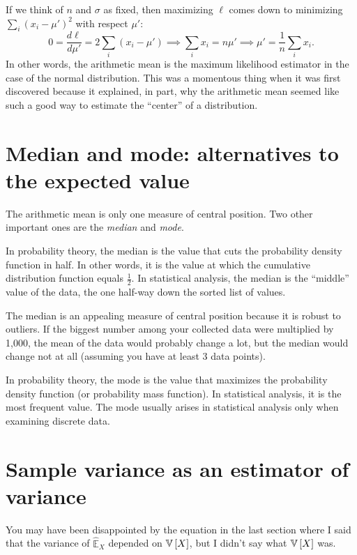 If we think of $n$ and $\sigma$ as fixed, then maximizing $\ell$ comes down to
minimizing $\sum_i (x_i - \mu')^2$ with respect $\mu'$:
\begin{equation}
  0 = \frac{d \ell}{d \mu'} = 2 \sum_i (x_i - \mu') \implies \sum_i x_i = n \mu' \implies \mu' = \frac{1}{n} \sum_i x_i.
\end{equation}
In other words, the arithmetic mean is the maximum likelihood estimator in the
case of the normal distribution. This was a momentous thing when it was first
discovered because it explained, in part, why the arithmetic mean seemed like
such a good way to estimate the ``center'' of a distribution.

\section{Median and mode: alternatives to the expected value}

The arithmetic mean is only one measure of central position. Two other
important ones are the \emph{median} and \emph{mode}.

In probability theory, the median is the value that cuts the probability
density function in half. In other words, it is the value at which the
cumulative distribution function equals $\tfrac{1}{2}$. In statistical
analysis, the median is the ``middle'' value of the data, the one half-way
down the sorted list of values.

The median is an appealing measure of central position because it is robust to
outliers. If the biggest number among your collected data were multiplied by
1,000, the mean of the data would probably change a lot, but the median would
change not at all (assuming you have at least 3 data points).

In probability theory, the mode is the value that maximizes the probability
density function (or probability mass function). In statistical analysis, it
is the most frequent value. The mode usually arises in statistical analysis
only when examining discrete data.

\section{Sample variance as an estimator of variance}

You may have been disappointed by the equation in the last section where I
said that the variance of $\hat{\mathbb{E}}_X$ depended on $\mathbb{V}\left[{X}\right]$, but I
didn't say what $\mathbb{V}\left[{X}\right]$ was.

